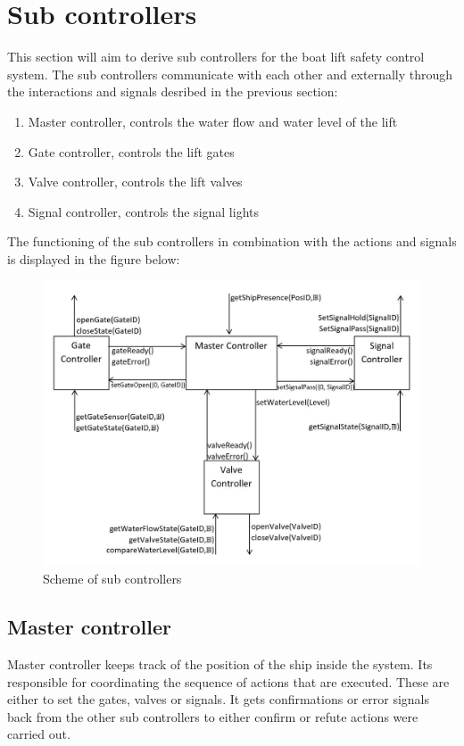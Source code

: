 \section{Sub controllers}
This section will aim to derive sub controllers for the boat lift safety control system. The sub controllers communicate with each other and externally through the interactions and signals desribed in the previous section:

\begin{enumerate}
	\item Master controller, controls the water flow and water level of the lift
	\item Gate controller, controls the lift gates
	\item Valve controller, controls the lift valves
	\item Signal controller, controls the signal lights
\end{enumerate}

The functioning of the sub controllers in combination with the actions and signals is displayed in the figure below:
	
\begin{figure}[!h]
	\includegraphics[width=\linewidth]{controllers}
	\caption{Scheme of sub controllers}
	\label{fig:subcontrollers}
\end{figure}
\subsection{Master controller}
Master controller keeps track of the position of the ship inside the system. Its responsible for coordinating the sequence of actions that are executed. These are either to set the gates, valves or signals. It gets confirmations or error signals back from the other sub controllers to either confirm or refute actions were carried out. \\

